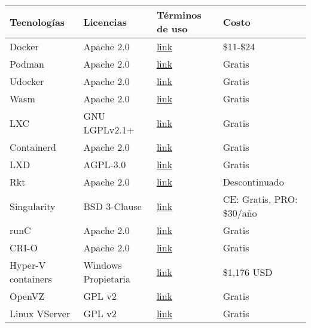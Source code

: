 \begin{table}[H]
\centering
\scriptsize
\setlength{\tabcolsep}{3pt}
\renewcommand{\arraystretch}{1.1}
\begin{tabular}{|>{\centering\arraybackslash}m{}| 
                >{\centering\arraybackslash}m{}| 
                >{\centering\arraybackslash}m{}| 
                >{\centering\arraybackslash}m{}|}
\hline
\textbf{Tecnologías} & \textbf{Licencias} & \textbf{Términos de uso} & \textbf{Costo} \\
\hline
Docker & Apache 2.0 & \href{https://www.docker.com/legal/docker-terms-service/}{link} & \$11-\$24 \\
\hline
Podman & Apache 2.0 & \href{https://github.com/containers/podman/blob/main/LICENSE}{link} & Gratis \\
\hline
Udocker & Apache 2.0 & \href{https://github.com/indigo-dc/udocker/blob/master/LICENSE}{link} & Gratis \\
\hline
Wasm & Apache 2.0 & \href{https://github.com/WebAssembly/design/blob/main/LICENSE}{link} & Gratis \\
\hline
LXC & GNU LGPLv2.1+ & \href{https://linuxcontainers.org/lxc/introduction/}{link} & Gratis \\
\hline
Containerd & Apache 2.0 & \href{https://github.com/containerd/containerd/blob/main/LICENSE}{link} & Gratis \\
\hline
LXD & AGPL-3.0 & \href{https://github.com/canonical/lxd}{link} & Gratis \\
\hline
Rkt & Apache 2.0 & \href{https://github.com/rkt/rkt/blob/master/LICENSE}{link} & Descontinuado \\
\hline
Singularity & BSD 3-Clause & \href{https://github.com/sylabs/singularity/blob/main/LICENSE.md}{link} & CE: Gratis, PRO: \$30/año \\
\hline
runC & Apache 2.0 & \href{https://github.com/opencontainers/runc/blob/main/LICENSE}{link} & Gratis \\
\hline
CRI-O & Apache 2.0 & \href{https://github.com/cri-o/cri-o/blob/main/LICENSE}{link} & Gratis \\
\hline
Hyper-V containers & Windows Propietaria & \href{https://learn.microsoft.com/es-es/virtualization/windowscontainers/images-eula}{link} & \$1,176 USD \\
\hline
OpenVZ & GPL v2 & \href{https://openvz.org/}{link} & Gratis \\
\hline
Linux VServer & GPL v2 & \href{http://linux-vserver.org/}{link} & Gratis \\

\end{tabular}
\end{table}
